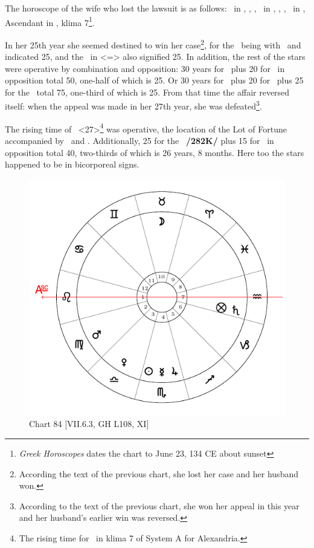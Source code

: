 The horoscope of the wife who lost the lawsuit is as follows: \Sun\, in \Cancer, \Moon, \Saturn, \Jupiter\, in
\Sagittarius, \Mars, \Venus, \Mercury\, in \Gemini, Ascendant in \Capricorn, klima 7\footnote{\textit{Greek Horoscopes} dates the chart to June 23, 134 CE about sunset}.

In her 25th year she seemed destined to win her case\footnote{According the text of the previous chart, she lost her case and her husband won.}, for the \Moon\, being with \Jupiter\, and \Saturn\, indicated 25, and the \Sun\, in \Cancer <=\Moon> also signified 25. In addition, the rest of the stars were operative by combination and opposition: 30 years for \Saturn\, plus 20 for \Mercury\, in opposition total 50, one-half of which is 25. Or 30
years for \Saturn\, plus 20 for \Mercury\, plus 25 for the \Moon\, total 75, one-third of which is 25. From that time the affair reversed itself: when the appeal was made in her 27th year, she was defeated\footnote{According to the text of the previous chart, she won her appeal in this year and her husband's earlier win was reversed.}. 

The rising time of \Gemini\, <27>\footnote{The rising time for \Gemini\, in klima 7 of System A for Alexandria.} was operative, the location of the Lot of Fortune accompanied by \Mars\, and \Mercury. Additionally, 25 for the \Moon\, \textbf{/282K/} plus 15 for \Mars\, in opposition total 40, two-thirds of which is 26 years, 8 months. Here too the stars happened to be in bicorporeal signs.

\newpage
\begin{figure}
\centering
\vspace{0pt}
\includegraphics[width=.68\textwidth]{charts/7_6_03}
\caption{Chart 84 [VII.6.3, GH L108, XI]}
\label{fig:chart84}
\end{figure} 

